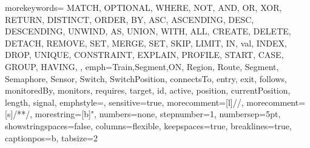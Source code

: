 {
	morekeywords={
		MATCH, OPTIONAL, WHERE, NOT, AND, OR, XOR, RETURN, DISTINCT, ORDER, BY, ASC, ASCENDING, DESC, DESCENDING, UNWIND, AS, UNION, WITH, ALL, CREATE, DELETE, DETACH, REMOVE, SET, MERGE, SET, SKIP, LIMIT, IN, val,
		INDEX, DROP, UNIQUE, CONSTRAINT, EXPLAIN, PROFILE, START, CASE,
		GROUP, HAVING,
	},
	emph={Train,Segment,ON, Region, Route, Segment, Semaphore, Sensor, Switch, SwitchPosition, connectsTo, entry, exit, follows, monitoredBy, monitors, requires, target, id, active, position, currentPosition, length, signal},
	emphstyle={\color{emphColor}},
	sensitive=true,
	morecomment=[l]{//},
	morecomment=[s]{/*}{*/},
	morestring=[b]{"},
	numbers=none,
	stepnumber=1,
	numbersep=5pt,
	showstringspaces=false,
	columns=flexible,
	keepspaces=true,
	breaklines=true,	
	captionpos=b,
	tabsize=2
}
\newcommand{\cypherStyle}[1]{\lstinline[style=cypherbig]@#1@}


